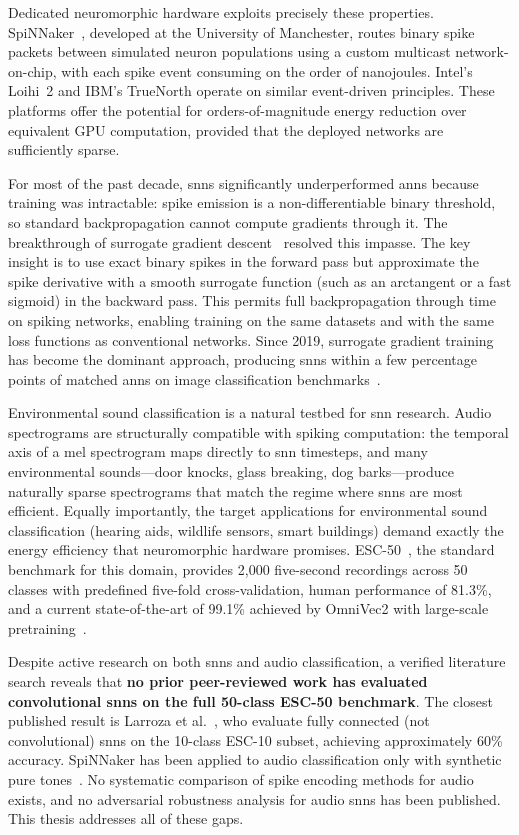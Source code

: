 Dedicated neuromorphic hardware exploits precisely these properties.
SpiNNaker~\citep{furber2014spinnaker}, developed at the University of Manchester, routes binary spike packets between simulated neuron populations using a custom multicast network-on-chip, with each spike event consuming on the order of nanojoules.
Intel's Loihi~2 and IBM's TrueNorth operate on similar event-driven principles.
These platforms offer the potential for orders-of-magnitude energy reduction over equivalent GPU computation, provided that the deployed networks are sufficiently sparse.

For most of the past decade, \glspl{snn} significantly underperformed \glspl{ann} because training was intractable: spike emission is a non-differentiable binary threshold, so standard backpropagation cannot compute gradients through it.
The breakthrough of surrogate gradient descent~\citep{neftci2019surrogate} resolved this impasse.
The key insight is to use exact binary spikes in the forward pass but approximate the spike derivative with a smooth surrogate function (such as an arctangent or a fast sigmoid) in the backward pass.
This permits full backpropagation through time on spiking networks, enabling training on the same datasets and with the same loss functions as conventional networks.
Since 2019, surrogate gradient training has become the dominant approach, producing \glspl{snn} within a few percentage points of matched \glspl{ann} on image classification benchmarks~\citep{eshraghian2023snntorch}.

Environmental sound classification is a natural testbed for \gls{snn} research.
Audio spectrograms are structurally compatible with spiking computation: the temporal axis of a mel spectrogram maps directly to \gls{snn} timesteps, and many environmental sounds---door knocks, glass breaking, dog barks---produce naturally sparse spectrograms that match the regime where \glspl{snn} are most efficient.
Equally importantly, the target applications for environmental sound classification (hearing aids, wildlife sensors, smart buildings) demand exactly the energy efficiency that neuromorphic hardware promises.
ESC-50~\citep{piczak2015esc50}, the standard benchmark for this domain, provides 2{,}000 five-second recordings across 50 classes with predefined five-fold cross-validation, human performance of 81.3\%, and a current state-of-the-art of 99.1\% achieved by OmniVec2 with large-scale pretraining~\citep{srivastava2024omnivec2}.

Despite active research on both \glspl{snn} and audio classification, a verified literature search reveals that \textbf{no prior peer-reviewed work has evaluated convolutional \glspl{snn} on the full 50-class ESC-50 benchmark}.
The closest published result is Larroza et al.~\citep{larroza2025}, who evaluate fully connected (not convolutional) \glspl{snn} on the 10-class ESC-10 subset, achieving approximately 60\% accuracy.
SpiNNaker has been applied to audio classification only with synthetic pure tones~\citep{dominguezmorales2016}.
No systematic comparison of spike encoding methods for audio exists, and no adversarial robustness analysis for audio \glspl{snn} has been published.
This thesis addresses all of these gaps.

